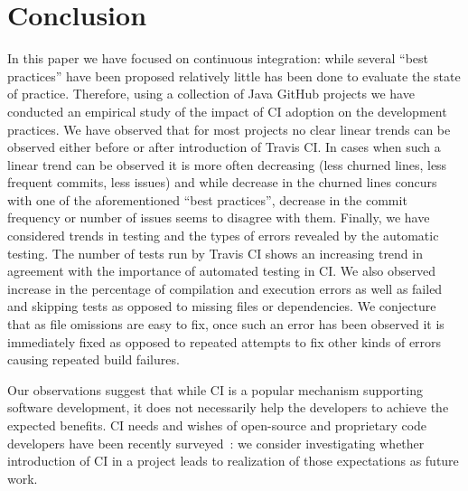 \section{Conclusion}
\label{sec:conc}
In this paper we have focused on continuous integration: while several ``best practices'' have been proposed relatively little has been done to evaluate the state of practice.
Therefore, using a collection of Java GitHub projects we have conducted an empirical study of the impact of CI adoption on the development practices.
We have observed that for most projects no clear linear trends can be observed either before or after introduction of Travis CI.
In cases when such a linear trend can be observed it is more often decreasing (less churned lines, less frequent commits, less issues) and while
decrease in the churned lines concurs with one of the aforementioned ``best practices'', decrease in the commit frequency or number of issues
seems to disagree with them. 
Finally, we have considered trends in testing and the types of errors revealed by the automatic testing.
The number of tests run by Travis CI shows an increasing trend  
in agreement with the importance of automated testing in CI.
We also observed increase in the percentage of compilation and execution errors as well as failed and skipping tests as opposed to missing files or dependencies.
We conjecture that as file omissions are easy to fix, once such an error has been observed it is immediately fixed as opposed to repeated attempts to fix other kinds
of errors causing repeated build failures.

Our observations suggest that while CI is a popular mechanism supporting software development, it does not necessarily help the developers to achieve the expected benefits. 
CI needs and wishes of open-source and proprietary code developers have been recently surveyed~\cite{Hilton2016,hilton2016continuous}: we consider investigating whether
introduction of CI in a project leads to realization of those expectations as future work.
